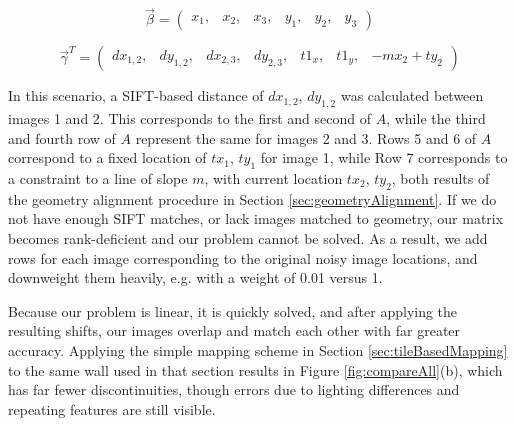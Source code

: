 \documentclass[]{spie}  %
\begin{document}
\[\vec{\beta} =
\begin{pmatrix}
  x_1, & x_2, & x_3, & y_1, & y_2, & y_3
\end{pmatrix}
\]

\[
\vec{\gamma}^T =
\begin{pmatrix}
  dx_{1,2}, &dy_{1,2}, &dx_{2,3}, &dy_{2,3}, &t1_x, &t1_y, & -mx_2 +
  ty_2
\end{pmatrix}
\]


In this scenario, a SIFT-based distance of $dx_{1,2}$, $dy_{1,2}$ was
calculated between images 1 and 2. This corresponds to the first and
second of $A$, while the third and fourth row of $A$ represent the
same for images 2 and 3. Rows 5 and 6 of $A$ correspond to a fixed
location of $tx_1$, $ty_1$ for image 1, while Row 7 corresponds to a
constraint to a line of slope $m$, with current location $tx_2$,
$ty_2$, both results of the geometry alignment procedure in Section
\ref{sec:geometryAlignment}. If we do not have enough SIFT matches, or
lack images matched to geometry, our matrix becomes rank-deficient and
our problem cannot be solved. As a result, we add rows for each image
corresponding to the original noisy image locations, and downweight
them heavily, e.g. with a weight of 0.01 versus 1.

Because our problem is linear, it is quickly solved, and after
applying the resulting shifts, our images overlap and match each other
with far greater accuracy. Applying the simple mapping scheme in
Section \ref{sec:tileBasedMapping} to the same wall used in that
section results in Figure \ref{fig:compareAll}(b), which has far fewer
discontinuities, though errors due to lighting differences and
repeating features are still visible.

\end{document}
